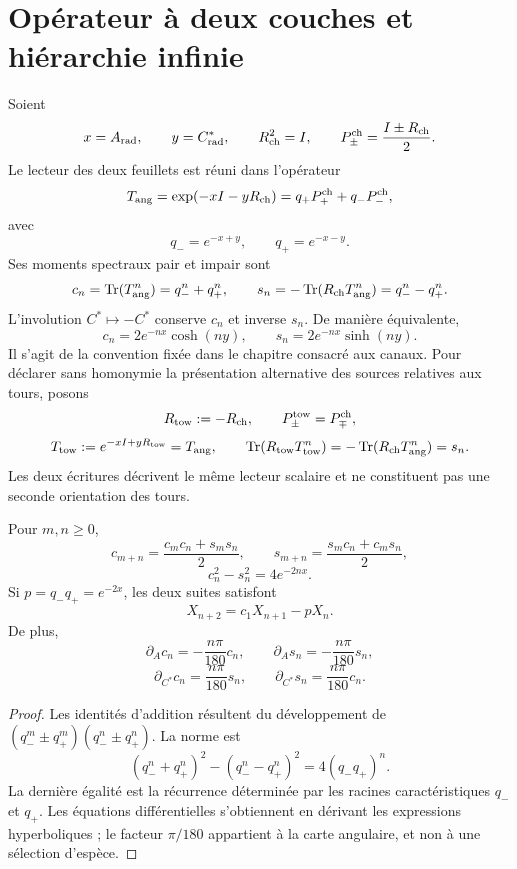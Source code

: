 \section{Opérateur à deux couches et hiérarchie infinie}
\label{sec:jerarquia-espectral-infinita-rev7}

Soient
\[
 x=A_{\rm rad},\qquad y=C^*_{\rm rad},\qquad
 R_{\rm ch}^2=I,\qquad
 P_\pm^{\rm ch}=\frac{I\pm R_{\rm ch}}2.
\]
Le lecteur des deux feuillets est réuni dans l'opérateur
\[
 T_{\rm ang}=\exp(-xI-yR_{\rm ch})
 =q_+P_+^{\rm ch}+q_-P_-^{\rm ch},
\]
avec
\[
 q_-=e^{-x+y},\qquad q_+=e^{-x-y}.
\]
Ses moments spectraux pair et impair sont
\[
 c_n=\operatorname{Tr}(T_{\rm ang}^n)=q_-^n+q_+^n,\qquad
 s_n=-\operatorname{Tr}(R_{\rm ch}T_{\rm ang}^n)=q_-^n-q_+^n.
\]
L'involution \(C^*\mapsto-C^*\) conserve \(c_n\) et inverse \(s_n\). De manière équivalente,
\[
 c_n=2e^{-nx}\cosh(ny),\qquad
 s_n=2e^{-nx}\sinh(ny).
\]
Il s'agit de la convention fixée dans le chapitre consacré aux canaux. Pour déclarer sans homonymie la présentation alternative des sources relatives aux tours, posons
\[
 R_{\rm tow}:=-R_{\rm ch},\qquad
 P_\pm^{\rm tow}=P_\mp^{\rm ch},
\]
\[
 T_{\rm tow}:=e^{-xI+yR_{\rm tow}}=T_{\rm ang},\qquad
 \operatorname{Tr}(R_{\rm tow}T_{\rm tow}^n)
 =-\operatorname{Tr}(R_{\rm ch}T_{\rm ang}^n)=s_n.
\]
Les deux écritures décrivent le même lecteur scalaire et ne constituent pas une seconde orientation des tours.

\begin{theorem}
\label{thm:recurrencia-bicapa-rev7}
Pour \(m,n\ge0\),
\[
 c_{m+n}=\frac{c_mc_n+s_ms_n}{2},\qquad
 s_{m+n}=\frac{s_mc_n+c_ms_n}{2},
\]
\[
 c_n^2-s_n^2=4e^{-2nx}.
\]
Si \(p=q_-q_+=e^{-2x}\), les deux suites satisfont
\[
 X_{n+2}=c_1X_{n+1}-pX_n.
\]
De plus,
\[
 \partial_Ac_n=-\frac{n\pi}{180}c_n,
 \qquad
 \partial_As_n=-\frac{n\pi}{180}s_n,
\]
\[
 \partial_{C^*}c_n=\frac{n\pi}{180}s_n,
 \qquad
 \partial_{C^*}s_n=\frac{n\pi}{180}c_n.
\]
\end{theorem}

\begin{proof}
Les identités d'addition résultent du développement de \((q_-^m\pm q_+^m)(q_-^n\pm q_+^n)\). La norme est
\[
 (q_-^n+q_+^n)^2-(q_-^n-q_+^n)^2
 =4(q_-q_+)^n.
\]
La dernière égalité est la récurrence déterminée par les racines caractéristiques \(q_-\) et \(q_+\). Les équations différentielles s'obtiennent en dérivant les expressions hyperboliques ; le facteur \(\pi/180\) appartient à la carte angulaire, et non à une sélection d'espèce.
\end{proof}

